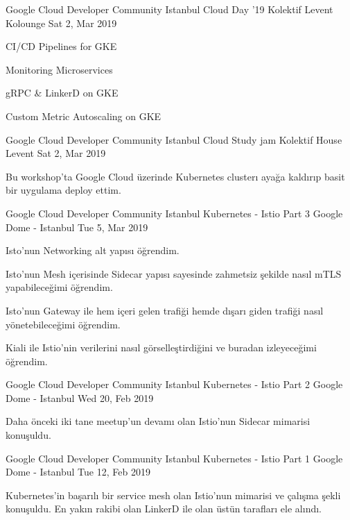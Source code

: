 \begin{cventries}
    \cventry
    {Google Cloud Developer Community Istanbul}
    {Cloud Day '19}
    {Kolektif Levent Kolounge}
    {Sat 2, Mar 2019}
    {
      \begin{cvitems}
        \item{CI/CD Pipelines for GKE}
        \item{Monitoring Microservices}
        \item{gRPC \& LinkerD on GKE}
        \item{Custom Metric Autoscaling on GKE}
      \end{cvitems}
    }
    
    \cventry
    {Google Cloud Developer Community Istanbul}
    {Cloud Study jam}
    {Kolektif House Levent}
    {Sat 2, Mar 2019}
    {
      \begin{cvitems}
        \item{Bu workshop'ta Google Cloud üzerinde Kubernetes clusterı ayağa kaldırıp basit bir uygulama deploy ettim.}
      \end{cvitems}
    }
    
    \cventry
    {Google Cloud Developer Community Istanbul}
    {Kubernetes - Istio Part 3}
    {Google Dome - Istanbul}
    {Tue 5, Mar 2019}
    {
      \begin{cvitems}
        \item{Isto'nun Networking alt yapısı öğrendim.}
        \item{Isto'nun Mesh içerisinde Sidecar yapısı sayesinde zahmetsiz şekilde nasıl mTLS yapabileceğimi öğrendim.}
        \item{Isto'nun Gateway ile hem içeri gelen trafiği hemde dışarı giden trafiği nasıl yönetebileceğimi öğrendim.}
        \item{Kiali ile Istio'nin verilerini nasıl görselleştirdiğini ve buradan izleyeceğimi öğrendim.}
      \end{cvitems}
    }
    
    \cventry
    {Google Cloud Developer Community Istanbul}
    {Kubernetes - Istio Part 2}
    {Google Dome - Istanbul}
    {Wed 20, Feb 2019}
    {
      \begin{cvitems}
        \item{Daha önceki iki tane meetup'un devamı olan Istio'nun Sidecar mimarisi konuşuldu.}
      \end{cvitems}
    }
    
    \cventry
    {Google Cloud Developer Community Istanbul}
    {Kubernetes - Istio Part 1}
    {Google Dome - Istanbul}
    {Tue 12, Feb 2019}
    {
      \begin{cvitems}
        \item{Kubernetes'in başarılı bir service mesh olan Istio'nun mimarisi ve çalışma şekli konuşuldu. En yakın rakibi olan LinkerD ile olan üstün tarafları ele alındı.}
      \end{cvitems}
    }
    

\end{cventries}
